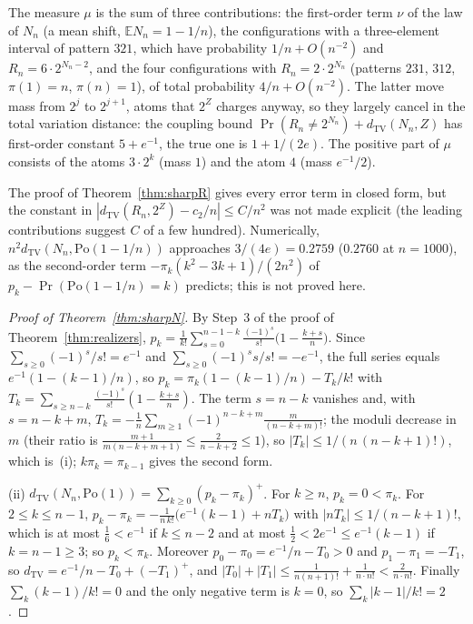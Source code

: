 \noindent The measure $\mu$ is the sum of three contributions: the first-order term $\nu$ of the law of $N_n$ (a mean shift, $\mathbb E N_n=1-1/n$), the configurations with a three-element interval of pattern $321$, which have probability $1/n+O(n^{-2})$ and $R_n=6\cdot2^{N_n-2}$, and the four configurations with $R_n=2\cdot2^{N_n}$ (patterns $231$, $312$, $\pi(1)=n$, $\pi(n)=1$), of total probability $4/n+O(n^{-2})$. The latter move mass from $2^{j}$ to $2^{j+1}$, atoms that $2^Z$ charges anyway, so they largely cancel in the total variation distance: the coupling bound $\Pr(R_n\ne2^{N_n})+d_{\mathrm{TV}}(N_n,Z)$ has first-order constant $5+e^{-1}$, the true one is $1+1/(2e)$. The positive part of $\mu$ consists of the atoms $3\cdot2^k$ (mass $1$) and the atom $4$ (mass $e^{-1}/2$).

\begin{remark}\label{rem:sharpopen}
The proof of Theorem~\ref{thm:sharpR} gives every error term in closed form, but the constant in $|d_{\mathrm{TV}}(R_n,2^Z)-c_2/n|\le C/n^2$ was not made explicit (the leading contributions suggest $C$ of a few hundred). Numerically, $n^2d_{\mathrm{TV}}(N_n,\mathrm{Po}(1-1/n))$ approaches $3/(4e)=0.2759$ ($0.2760$ at $n=1000$), as the second-order term $-\pi_k(k^2-3k+1)/(2n^2)$ of $p_k-\Pr(\mathrm{Po}(1-1/n)=k)$ predicts; this is not proved here. 
\end{remark}

\begin{proof}[Proof of Theorem~\ref{thm:sharpN}]
By Step~3 of the proof of Theorem~\ref{thm:realizers}, $p_k=\frac1{k!}\sum_{s=0}^{n-1-k}\frac{(-1)^s}{s!}\bigl(1-\frac{k+s}n\bigr)$. Since $\sum_{s\ge0}(-1)^s/s!=e^{-1}$ and $\sum_{s\ge0}(-1)^ss/s!=-e^{-1}$, the full series equals $e^{-1}(1-(k-1)/n)$, so $p_k=\pi_k(1-(k-1)/n)-T_k/k!$ with $T_k=\sum_{s\ge n-k}\frac{(-1)^s}{s!}(1-\frac{k+s}n)$. The term $s=n-k$ vanishes and, with $s=n-k+m$, $T_k=-\frac1n\sum_{m\ge1}(-1)^{n-k+m}\frac{m}{(n-k+m)!}$; the moduli decrease in $m$ (their ratio is $\frac{m+1}{m(n-k+m+1)}\le\frac2{n-k+2}\le1$), so $|T_k|\le1/(n\,(n-k+1)!)$, which is~(i); $k\pi_k=\pi_{k-1}$ gives the second form.

(ii) $d_{\mathrm{TV}}(N_n,\mathrm{Po}(1))=\sum_{k\ge0}(p_k-\pi_k)^+$. For $k\ge n$, $p_k=0<\pi_k$. For $2\le k\le n-1$, $p_k-\pi_k=-\frac1{n\,k!}\bigl(e^{-1}(k-1)+nT_k\bigr)$ with $|nT_k|\le1/(n-k+1)!$, which is at most $\frac16<e^{-1}$ if $k\le n-2$ and at most $\frac12<2e^{-1}\le e^{-1}(k-1)$ if $k=n-1\ge3$; so $p_k<\pi_k$. Moreover $p_0-\pi_0=e^{-1}/n-T_0>0$ and $p_1-\pi_1=-T_1$, so $d_{\mathrm{TV}}=e^{-1}/n-T_0+(-T_1)^+$, and $|T_0|+|T_1|\le\frac1{n(n+1)!}+\frac1{n\cdot n!}<\frac2{n\cdot n!}$. Finally $\sum_k(k-1)/k!=0$ and the only negative term is $k=0$, so $\sum_k|k-1|/k!=2$.
\end{proof}

